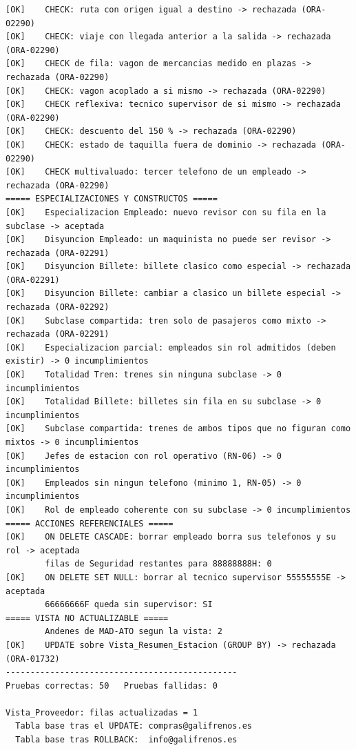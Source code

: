 \documentclass[11pt,a4paper]{article}
\DeclareRobustCommand{\_}{\textunderscore\allowbreak}
\begin{document}
\begin{lstlisting}[basicstyle=\ttfamily\scriptsize]
[OK]    CHECK: ruta con origen igual a destino -> rechazada (ORA-02290)
[OK]    CHECK: viaje con llegada anterior a la salida -> rechazada (ORA-02290)
[OK]    CHECK de fila: vagon de mercancias medido en plazas -> rechazada (ORA-02290)
[OK]    CHECK: vagon acoplado a si mismo -> rechazada (ORA-02290)
[OK]    CHECK reflexiva: tecnico supervisor de si mismo -> rechazada (ORA-02290)
[OK]    CHECK: descuento del 150 % -> rechazada (ORA-02290)
[OK]    CHECK: estado de taquilla fuera de dominio -> rechazada (ORA-02290)
[OK]    CHECK multivaluado: tercer telefono de un empleado -> rechazada (ORA-02290)
===== ESPECIALIZACIONES Y CONSTRUCTOS =====
[OK]    Especializacion Empleado: nuevo revisor con su fila en la subclase -> aceptada
[OK]    Disyuncion Empleado: un maquinista no puede ser revisor -> rechazada (ORA-02291)
[OK]    Disyuncion Billete: billete clasico como especial -> rechazada (ORA-02291)
[OK]    Disyuncion Billete: cambiar a clasico un billete especial -> rechazada (ORA-02292)
[OK]    Subclase compartida: tren solo de pasajeros como mixto -> rechazada (ORA-02291)
[OK]    Especializacion parcial: empleados sin rol admitidos (deben existir) -> 0 incumplimientos
[OK]    Totalidad Tren: trenes sin ninguna subclase -> 0 incumplimientos
[OK]    Totalidad Billete: billetes sin fila en su subclase -> 0 incumplimientos
[OK]    Subclase compartida: trenes de ambos tipos que no figuran como mixtos -> 0 incumplimientos
[OK]    Jefes de estacion con rol operativo (RN-06) -> 0 incumplimientos
[OK]    Empleados sin ningun telefono (minimo 1, RN-05) -> 0 incumplimientos
[OK]    Rol de empleado coherente con su subclase -> 0 incumplimientos
===== ACCIONES REFERENCIALES =====
[OK]    ON DELETE CASCADE: borrar empleado borra sus telefonos y su rol -> aceptada
        filas de Seguridad restantes para 88888888H: 0
[OK]    ON DELETE SET NULL: borrar al tecnico supervisor 55555555E -> aceptada
        66666666F queda sin supervisor: SI
===== VISTA NO ACTUALIZABLE =====
        Andenes de MAD-ATO segun la vista: 2
[OK]    UPDATE sobre Vista_Resumen_Estacion (GROUP BY) -> rechazada (ORA-01732)
-----------------------------------------------
Pruebas correctas: 50   Pruebas fallidas: 0

Vista_Proveedor: filas actualizadas = 1
  Tabla base tras el UPDATE: compras@galifrenos.es
  Tabla base tras ROLLBACK:  info@galifrenos.es
\end{lstlisting}
\end{document}
